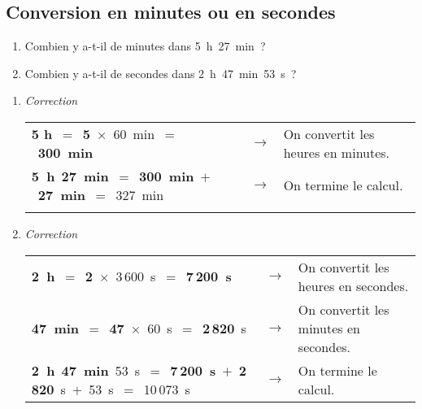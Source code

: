 \begin{methode*1}

\subsection{Conversion en minutes ou en secondes}

\begin{exemple*1}
\begin{enumerate}
 \item Combien y a-t-il de minutes dans 5 h 27 min ?
 \item Combien y a-t-il de secondes dans 2 h 47 min 53 s ?
 \end{enumerate}
 

\begin{enumerate}
 
 \item \emph{Correction}

\begin{tabular}{lcl} 
\textcolor{bleu}{\textbf{5 h}} $=$ \textcolor{bleu}{\textbf{5}} $\times$ 60 min $=$ \textcolor{bleu}{\textbf{300 min}}  & $\longrightarrow$ & On convertit les heures en minutes. \\
\textcolor{bleu}{\textbf{5 h}} \textcolor{vert}{\textbf{27 min}} $=$ \textcolor{bleu}{\textbf{300 min}} $+$ \textcolor{vert}{\textbf{27 min}} $=$ 327 min & $\longrightarrow$ & On termine le calcul.\\
\phantom{2 h 47 min 53 s $=$ 7\,200 s $+$ 2\,820 s $+$ 53 s $=$ 10\,073 s} & \\ %
 \end{tabular} 
 
 \item \emph{Correction}
 
\begin{tabular}{lcl} 
\textcolor{bleu}{\textbf{2 h}} $=$ \textcolor{bleu}{\textbf{2}} $\times$ 3\,600 s $=$ \textcolor{bleu}{\textbf{7\,200 s}} & $\longrightarrow$ & On convertit les heures en secondes. \\
\textcolor{vert}{\textbf{47 min}} $=$ \textcolor{vert}{\textbf{47}} $\times$ 60 s $=$ \textcolor{vert}{\textbf{2\,820}} s & $\longrightarrow$ & On convertit les minutes en secondes. \\
\textcolor{bleu}{\textbf{2 h}} \textcolor{vert}{\textbf{47 min}} 53 s $=$ \textcolor{bleu}{\textbf{7\,200 s}} $+$ \textcolor{vert}{\textbf{2\,820}} s $+$ 53 s $=$ 10\,073 s & $\longrightarrow$ & On termine le calcul. \\
 \end{tabular}
 \end{enumerate}
\end{exemple*1}



\end{methode*1}

